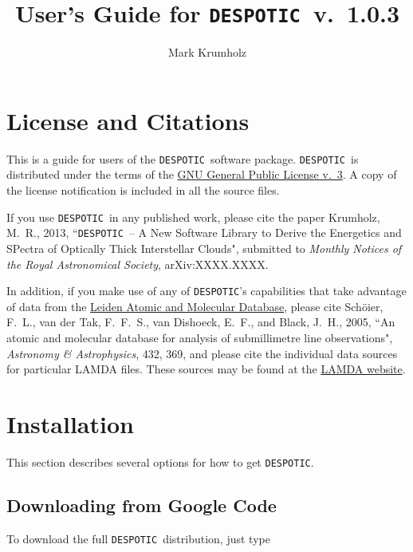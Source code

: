 \documentclass[12pt]{article}
\newcommand{\despotic}{\texttt{DESPOTIC}}
\begin{document}
\title{User's Guide for \despotic\ v.~1.0.3}
\author{Mark Krumholz}

\maketitle

\tableofcontents

\clearpage

\section{License and Citations}

This is a guide for users of the \despotic\ software package. \despotic\ is distributed under the terms of the \href{http://http://www.gnu.org/licenses/gpl.html}{GNU General Public License v.~3}. A copy of the license notification is included in all the source files.

If you use \despotic\ in any published work, please cite the paper Krumholz, M.~R., 2013, ``\despotic\ -- A New Software Library to Derive the Energetics and SPectra of Optically Thick Interstellar Clouds", submitted to \textit{Monthly Notices of the Royal Astronomical Society}, arXiv:XXXX.XXXX.

In addition, if you make use of any of \despotic's capabilities that take advantage of data from the \href{http://home.strw.leidenuniv.nl/~moldata/}{Leiden Atomic and Molecular Database}, please cite Sch\"oier, F.~L., van der Tak, F.~F.~S., van Dishoeck, E.~F., and Black, J.~H., 2005, ``An atomic and molecular database for analysis of submillimetre line observations", \textit{Astronomy \& Astrophysics}, 432, 369, and please cite the individual data sources for particular LAMDA files. These sources may be found at the \href{http://home.strw.leidenuniv.nl/~moldata/}{LAMDA website}.

\clearpage


\section{Installation}

This section describes several options for how to get \despotic.

\subsection{Downloading from Google Code}

To download the full \despotic\ distribution, just type
\end{document}
